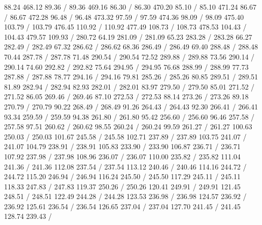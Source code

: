 { 88.24 468.12 89.36 /
 89.36 469.16 86.30 /
 86.30 470.20 85.10 /
 85.10 471.24 86.67 /
 86.67 472.28 96.48 /
 96.48 473.32 97.59 /
 97.59 474.36 98.09 /
 98.09 475.40 103.79 /
 103.79 476.45 110.92 /
 110.92 477.49 108.73 /
 108.73 478.53 104.43 /
 104.43 479.57 109.93 /
\setsolid
{} 280.72 64.19 281.09 /
 281.09 65.23 283.28 /
 283.28 66.27 282.49 /
 282.49 67.32 286.62 /
 286.62 68.36 286.49 /
 286.49 69.40 288.48 /
 288.48 70.44 287.78 /
 287.78 71.48 290.54 /
 290.54 72.52 289.88 /
 289.88 73.56 290.14 /
 290.14 74.60 292.82 /
 292.82 75.64 294.95 /
 294.95 76.68 288.99 /
 288.99 77.73 287.88 /
 287.88 78.77 294.16 /
 294.16 79.81 285.26 /
 285.26 80.85 289.51 /
 289.51 81.89 282.94 /
 282.94 82.93 282.01 /
 282.01 83.97 279.50 /
 279.50 85.01 271.52 /
 271.52 86.05 269.46 /
 269.46 87.10 272.53 /
 272.53 88.14 273.26 /
 273.26 89.18 270.79 /
 270.79 90.22 268.49 /
 268.49 91.26 264.43 /
 264.43 92.30 266.41 /
 266.41 93.34 259.59 /
 259.59 94.38 261.80 /
 261.80 95.42 256.60 /
 256.60 96.46 257.58 /
 257.58 97.51 260.62 /
 260.62 98.55 260.24 /
 260.24 99.59 261.27 /
 261.27 100.63 250.03 /
 250.03 101.67 245.58 /
 245.58 102.71 237.89 /
 237.89 103.75 241.07 /
 241.07 104.79 238.91 /
 238.91 105.83 233.90 /
 233.90 106.87 236.71 /
 236.71 107.92 237.98 /
 237.98 108.96 236.07 /
 236.07 110.00 235.82 /
 235.82 111.04 241.36 /
 241.36 112.08 237.54 /
 237.54 113.12 240.46 /
 240.46 114.16 244.72 /
 244.72 115.20 246.94 /
 246.94 116.24 245.50 /
 245.50 117.29 245.11 /
 245.11 118.33 247.83 /
 247.83 119.37 250.26 /
 250.26 120.41 249.91 /
 249.91 121.45 248.51 /
 248.51 122.49 244.28 /
 244.28 123.53 236.98 /
 236.98 124.57 236.92 /
 236.92 125.61 236.54 /
 236.54 126.65 237.04 /
 237.04 127.70 241.45 /
 241.45 128.74 239.43 /
}
